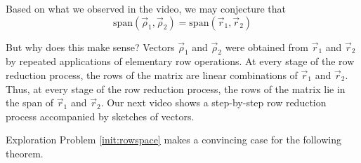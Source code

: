 \documentclass{ximera}
\begin{document}
\begin{exploration}

Based on what we observed in the video, we may conjecture that 
$$\mbox{span}(\vec{\rho}_1, \vec{\rho}_2)=\mbox{span}(\vec{r}_1, \vec{r}_2)$$

\begin{image}
\end{image}
But why does this make sense?  Vectors $\vec{\rho}_1$ and $\vec{\rho}_2$ were obtained from $\vec{r}_1$ and $\vec{r}_2$ by repeated applications of elementary row operations.  At every stage of the row reduction process, the rows of the matrix are linear combinations of $\vec{r}_1$ and $\vec{r}_2$.  Thus, at every stage of the row reduction process, the rows of the matrix lie in the span of $\vec{r}_1$ and $\vec{r}_2$.  Our next video shows a step-by-step row reduction process accompanied by sketches of vectors.


\end{exploration}

Exploration Problem \ref{init:rowspace} makes a convincing case for the following theorem.
\end{document}
